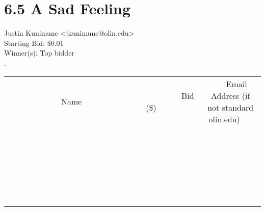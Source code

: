 \documentclass[11pt]{article}
\begin{document}
					\section*{6.5 A Sad Feeling}
					Justin Kunimune <jkunimune@olin.edu> \\
					Starting Bid: \$0.01 \\
					Winner(s): Top bidder \\
					. \\
					[6ex]
					\begin{tabular}{c c c}
						~~~~~~~~~~~~~Name~~~~~~~~~~~~~ & ~~~~~~~~~Bid (\$)~~~~~~~~~ & ~~~Email Address (if not standard olin.edu)~~~ \\
				
 & & \\
\hline
 & & \\
\hline
 & & \\
\hline
 & & \\
\hline
 & & \\
\hline
 & & \\
\hline
 & & \\
\hline
 & & \\
\hline
 & & \\
\hline
 & & \\
\hline
 & & \\
\hline
 & & \\
\hline
 & & \\
\hline
 & & \\
\hline
 & & \\
\hline
 & & \\
\hline
 & & \\
\hline
 & & \\
\hline
 & & \\
\hline
 & & \\
\hline
 & & \\
\hline
 & & \\
\hline
 & & \\
\hline
 & & \\
\hline
 & & \\
\hline
 & & \\
\hline
					\end{tabular}
					\clearpage
				
\end{document}
